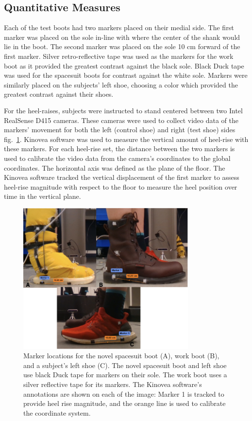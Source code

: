 \documentclass[defaultstyle,11pt]{thesis}
\begin{document}
\hypertarget{quantitative-measures}{%
\subsection{Quantitative Measures}\label{quantitative-measures}}

Each of the test boots had two markers placed on their medial side.
The first marker was placed on the sole in-line with where the center of the shank would lie in the boot.
The second marker was placed on the sole 10 cm forward of the first marker.
Silver retro-reflective tape was used as the markers for the work boot as it provided the greatest contrast against the black sole.
Black Duck tape was used for the spacesuit boots for contrast against the white sole.
Markers were similarly placed on the subjects' left shoe, choosing a color which provided the greatest contrast against their shoes.

For the heel-raises, subjects were instructed to stand centered between two Intel RealSense D415 cameras.
These cameras were used to collect video data of the markers' movement for both the left (control shoe) and right (test shoe) sides fig.~\ref{fig:SA4-Kinovea}.
Kinovea software was used to measure the vertical amount of heel-rise with these markers.
For each heel-rise set, the distance between the two markers is used to calibrate the video data from the camera's coordinates to the global coordinates.
The horizontal axis was defined as the plane of the floor.
The Kinovea software tracked the vertical displacement of the first marker to assess heel-rise magnitude with respect to the floor to measure the heel position over time in the vertical plane.

\begin{figure}
\hypertarget{fig:SA4-Kinovea}{%
\centering
\includegraphics[width=0.8\textwidth,height=\textheight]{../fig/SA4/Kinovea.png}
\caption{Marker locations for the novel spacesuit boot (A), work boot (B), and a subject's left shoe (C). The novel spacesuit boot and left shoe use black Duck tape for markers on their sole. The work boot uses a silver reflective tape for its markers. The Kinovea software's annotations are shown on each of the image: Marker 1 is tracked to provide heel rise magnitude, and the orange line is used to calibrate the coordinate system.}\label{fig:SA4-Kinovea}
}
\end{figure}
\end{document}
